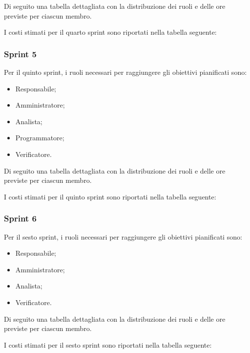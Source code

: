 Di seguito una tabella dettagliata con la distribuzione dei ruoli e delle ore previste per ciascun membro.



I costi stimati per il quarto sprint sono riportati nella tabella seguente:



\pagebreak
\subsubsection{Sprint 5}
Per il quinto sprint, i ruoli necessari per raggiungere gli obiettivi
pianificati sono:
\begin{itemize}
    \item Responsabile;
    \item Amministratore;
    \item Analista;
    \item Programmatore;
    \item Verificatore.
\end{itemize}


Di seguito una tabella dettagliata con la distribuzione dei ruoli e delle ore previste per ciascun membro.



I costi stimati per il quinto sprint sono riportati nella tabella seguente:



\pagebreak 
\subsubsection{Sprint 6}
Per il sesto sprint, i ruoli necessari per raggiungere gli obiettivi
pianificati sono:
\begin{itemize}
    \item Responsabile;
    \item Amministratore;
    \item Analista;
    \item Verificatore.
\end{itemize}


Di seguito una tabella dettagliata con la distribuzione dei ruoli e delle ore previste per ciascun membro.



I costi stimati per il sesto sprint sono riportati nella tabella seguente:

